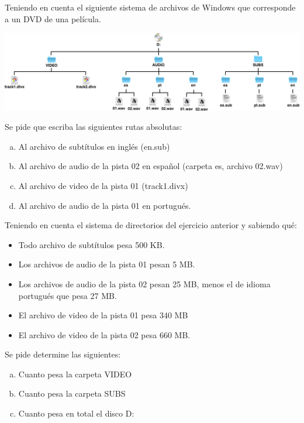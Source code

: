 \begin{exercise}
Teniendo en cuenta el siguiente sistema de archivos de Windows que corresponde a
un DVD de una película.

\centerline{\includegraphics[scale=0.4]{unidades/2_informacion/2_informatica/imagenes/directorios_windows_4.png}}

Se pide que escriba las siguientes rutas absolutas:
\begin{enumerate}[a)]
    \item Al archivo de subtítulos en inglés (en.sub)
    \item Al archivo de audio de la pista 02 en español (carpeta es, archivo
    02.wav)
    \item Al archivo de video de la pista 01 (track1.divx)
    \item Al archivo de audio de la pista 01 en portugués.
\end{enumerate}
\end{exercise}

\begin{exercise}
Teniendo en cuenta el sistema de directorios del ejercicio anterior y sabiendo
qué:
\begin{itemize}
    \item Todo archivo de subtítulos pesa 500 KB.
    \item Los archivos de audio de la pista 01 pesan 5 MB.
    \item Los archivos de audio de la pista 02 pesan 25 MB, menos el de idioma
        portugués que pesa 27 MB.
    \item El archivo de video de la pista 01 pesa 340 MB
    \item El archivo de video de la pista 02 pesa 660 MB.
\end{itemize}

Se pide determine las siguientes:
\begin{enumerate}[a)]
    \item Cuanto pesa la carpeta VIDEO
    \item Cuanto pesa la carpeta SUBS
    \item Cuanto pesa en total el disco D:
\end{enumerate}
\end{exercise}

